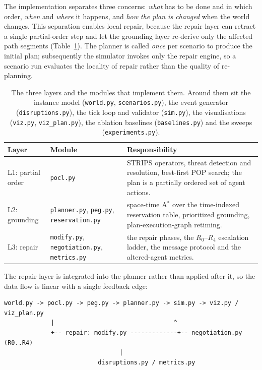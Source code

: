 \documentclass[10pt,a4paper]{article}
\newcommand{\code}[1]{\texttt{#1}}
\begin{document}
The implementation separates three concerns: \emph{what} has to be done and
in which order, \emph{when} and \emph{where} it happens, and \emph{how the
plan is changed} when the world changes.  This separation enables local
repair, because the repair layer can retract a single partial-order step and
let the grounding layer re-derive only the affected path segments
(Table~\ref{tab:layers}).  The planner is called \emph{once} per scenario to
produce the initial plan; subsequently the simulator invokes only the repair
engine, so a scenario run evaluates the locality of repair rather than the
quality of re-planning.

\begin{table}[H]
\centering
\small
\begin{tabularx}{\textwidth}{@{}l l X@{}}
\toprule
\textbf{Layer} & \textbf{Module} & \textbf{Responsibility} \\
\midrule
L1: partial order & \code{pocl.py} &
  STRIPS operators, threat detection and resolution, best-first POP search;
  the plan is a partially ordered set of agent actions.
\\ \addlinespace
L2: grounding & \code{planner.py}, \code{peg.py}, \code{reservation.py} &
  space-time A$^\ast$ over the time-indexed reservation table, prioritized
  grounding, plan-execution-graph retiming.
\\ \addlinespace
L3: repair & \code{modify.py}, \code{negotiation.py}, \code{metrics.py} &
  the repair phases, the $R_0$--$R_4$ escalation ladder, the message protocol
  and the altered-agent metrics.
\\
\bottomrule
\end{tabularx}
\caption{The three layers and the modules that implement them.  Around them
sit the instance model (\code{world.py}, \code{scenarios.py}), the event
generator (\code{disruptions.py}), the tick loop and validator
(\code{sim.py}), the visualisations (\code{viz.py}, \code{viz\_plan.py}), the
ablation baselines (\code{baselines.py}) and the sweeps
(\code{experiments.py}).}
\label{tab:layers}
\end{table}

The repair layer is integrated into the planner rather than applied after it,
so the data flow is linear with a single feedback edge:

\begin{lstlisting}[style=shell]
world.py -> pocl.py -> peg.py -> planner.py -> sim.py -> viz.py / viz_plan.py
             |                                 ^
             +-- repair: modify.py -------------+-- negotiation.py   (R0..R4)
                                |
                          disruptions.py / metrics.py
\end{lstlisting}
\end{document}
